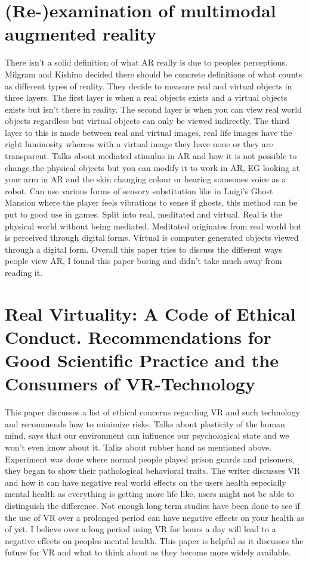 \documentclass{scrartcl}
\begin{document}
\section{(Re-)examination of multimodal augmented reality \cite{rosa2016re} }
There isn't a solid definition of what AR really is due to peoples perceptions. Milgram and Kishino decided there should be concrete definitions of what counts as different types of reality. They decide to measure real and virtual objects in three layers. The first layer is when a real objects exists and a virtual objects exists but isn't there in reality. The second layer is when you can view real world objects regardless but virtual objects can only be viewed indirectly. The third layer to this is made between real and virtual images, real life images have the right luminosity whereas with a virtual image they have none or they are transparent. Talks about mediated stimulus in AR and how it is not possible to change the physical objects but you can modify it to work in AR, EG looking at your arm in AR and the skin changing colour or hearing someones voice as a robot. Can use various forms of sensory substitution like in Luigi's Ghost Mansion where the player feels vibrations to sense if ghosts, this method can be put to good use in games. Split into real, meditated and virtual. Real is the physical world without being mediated. Meditated originates from real world but is perceived through digital forms. Virtual is computer generated objects viewed through a digital form. Overall this paper tries to discuss the different ways people view AR, I found this paper boring and didn't take much away from reading it.

\section{Real Virtuality: A Code of Ethical Conduct. Recommendations for Good Scientific Practice and the Consumers of VR-Technology \cite{madary2016real} }
This paper discusses a list of ethical concerns regarding VR and such technology and recommends how to minimize risks. Talks about plasticity of the human mind, says that our environment can influence our psychological state and we won't even know about it. Talks about rubber hand as mentioned above. Experiment was done where normal people played prison guards and prisoners, they began to show their pathological behavioral traits. The writer discusses VR and how it can have negative real world effects on the users health especially mental health as everything is getting more life like, users might not be able to distinguish the difference. Not enough long term studies have been done to see if the use of VR over a prolonged period can have negative effects on your health as of yet. I believe over a long period using VR for hours a day will lead to a negative effects on peoples mental health. This paper is helpful as it discusses the future for VR and what to think about as they become more widely available.
\end{document}
